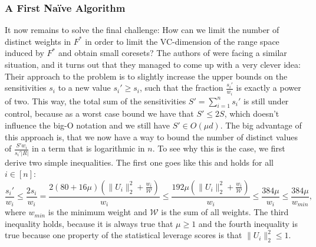 \subsubsection{A First Na\"ive Algorithm}
\label{sec:naive-algorihtm}

It now remains to solve the final challenge: How can we limit the
number of distinct weights in $F^\ast$ in order to limit
the VC-dimension of the range space induced by $F^\ast$ and obtain
small coresets? The authors of \cite{on-coresets} were facing
a similar situation, and it turns out that they managed to come
up with a very clever idea: Their approach to the problem is to
slightly increase the upper bounds on the sensitivities $s_i$ to
a new value $s_i' \geq s_i$, such that the fraction $\frac{s_i'}{w_i}$ is
exactly a power of two. This way, the total sum of the sensitivities
$S' = \sum_{i=1}^n s_i'$ is still under control, because as a worst
case bound we have that $S' \leq 2 S$, which doesn't influence the
big-O notation and we still have $S' \in O(\mu d)$.
The big advantage of this approach is, that we now have a way
to bound the number of distinct values of $\frac{S'w_i}{s_i' |R|}$
in a term that is logarithmic in $n$.
To see why this is the case, we first derive two simple
inequalities. The first one goes like this and holds for all
$i \in [n]$:
\begin{equation*}
    \frac{s_i'}{w_i} \leq \frac{2 s_i}{w_i}
    = \frac{2 (80 + 16\mu)(\lVert U_i \rVert_2^2 + \frac{w_i}{\mathcal{W}})}{w_i}
    \leq \frac{192\mu (\lVert U_i \rVert_2^2 + \frac{w_i}{\mathcal{W}})}{w_i}
    \leq \frac{384 \mu}{w_i}
    \leq \frac{384 \mu}{w_{min}},
\end{equation*}
where $w_{min}$ is the minimum weight and $\mathcal{W}$ is the sum
of all weights. The third inequality holds, because it is
always true that $\mu \geq 1$ and the fourth inequality is true because
one property of the statistical leverage scores
is that $\lVert U_i \rVert_2^2 \leq 1$.

